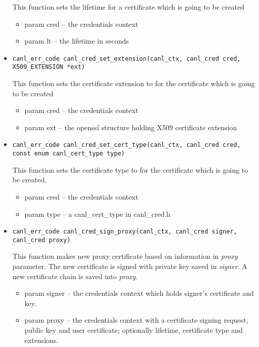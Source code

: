 \begin{itemize}
  This function sets the lifetime for a certificate which is going to 
  be created
  \begin{itemize}
    \item param cred -- the credentials context
    \item param lt -- the lifetime in seconds
  \end{itemize}
  \item \begin{verbatim}
canl_err_code canl_cred_set_extension(canl_ctx, canl_cred cred,
X509_EXTENSION *ext)\end{verbatim}
  This function sets the certificate extension to for the certificate 
  which is going to be created
  \begin{itemize}
    \item param cred -- the credentials context 
    \item param ext -- the openssl structure holding X509 certificate extension
  \end{itemize}
\item \begin{verbatim}
canl_err_code canl_cred_set_cert_type(canl_ctx, canl_cred cred,
const enum canl_cert_type type)\end{verbatim}
  This function sets the certificate type to for the certificate
  which is going to be created.
  \begin{itemize}
    \item param cred -- the credentials context
    \item param type -- a canl\_cert\_type in canl\_cred.h
  \end{itemize}
  \item \begin{verbatim}
canl_err_code canl_cred_sign_proxy(canl_ctx, canl_cred signer,
canl_cred proxy)\end{verbatim}
  This function makes new proxy certificate based on information in 
  \textit{proxy} parameter. The new certificate is signed with private key 
  saved in \textit{signer}. A new certificate chain is saved 
  into \textit{proxy}.
  \begin{itemize}
    \item param signer -- the credentials context which holds signer's certificate
    and key.
    \item param proxy -- the credentials context with a certificate 
    signing request, public key and user certificate; optionally lifetime,
    certificate type and extensions.
  \end{itemize}

\end{itemize}
